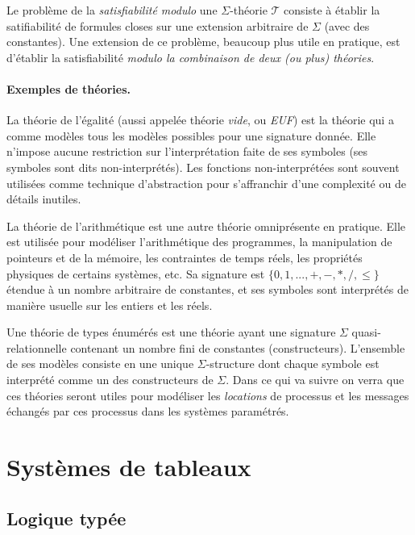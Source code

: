 \documentclass[a4paper, twoside]{scrartcl}
\theoremstyle{plain}%
\theoremstyle{definition}
\theoremstyle{remark}
\begin{document}
Le problème de la \emph{satisfiabilité modulo} une $\Sigma$-théorie
$\mathcal{T}$ consiste à établir la satifiabilité de formules closes
sur une extension arbitraire de $\Sigma$ (avec des constantes). 
Une extension de ce problème, beaucoup plus utile en pratique, est
d'établir la satisfiabilité \emph{modulo la combinaison de deux (ou
  plus) théories}.


\paragraph{Exemples de théories.}

La théorie de l'égalité (aussi appelée théorie \emph{vide}, ou
\emph{EUF}) est la théorie qui a comme modèles tous les modèles
possibles pour une signature donnée. Elle n'impose aucune restriction
sur l'interprétation faite de ses symboles (ses symboles sont dits
non-interprétés). Les fonctions non-interprétées sont souvent
utilisées comme technique d'abstraction pour s'affranchir d'une
complexité ou de détails inutiles.

La théorie de l'arithmétique est une autre théorie omniprésente en
pratique. Elle est utilisée pour modéliser l'arithmétique des
programmes, la manipulation de pointeurs et de la mémoire, les
contraintes de temps réels, les propriétés physiques de certains
systèmes, etc. Sa signature est $\{ 0, 1, ..., +, -, *, /, \leq\}$
étendue à un nombre arbitraire de constantes, et ses symboles sont
interprétés de manière usuelle sur les entiers et les réels.

Une théorie de types énumérés est une théorie ayant une signature
$\Sigma$ quasi-relationnelle contenant un nombre fini de constantes
(constructeurs). L'ensemble de ses modèles consiste en une unique
$\Sigma$-structure dont chaque symbole est interprété comme un des
constructeurs de $\Sigma$. Dans ce qui va suivre on verra que ces
théories seront utiles pour modéliser les \emph{locations} de
processus et les messages échangés par ces processus dans les systèmes
paramétrés.


\section{Systèmes de tableaux}


\subsection{Logique typée}\label{tht}
\end{document}
